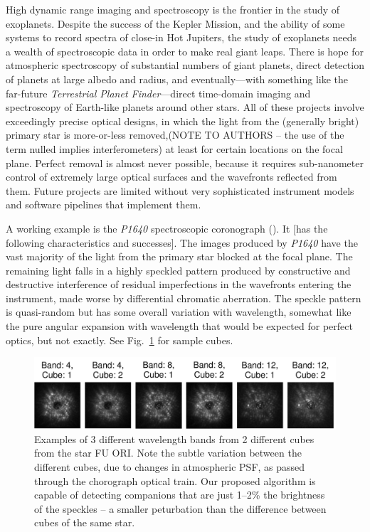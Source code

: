 \documentclass[12pt,pdftex,preprint]{aastex}
\newcommand{\project}[1]{\textsl{#1}}
\newcommand{\fig}[1]{Fig.\ \ref{fig:#1}}
\begin{document}
High dynamic range imaging and spectroscopy is the frontier in
the study of exoplanets. Despite the success of the Kepler Mission,
and the ability of some systems to record spectra of close-in Hot
Jupiters, the study of exoplanets needs a wealth of spectroscopic data
in order to make real giant leaps.  There is hope for atmospheric
spectroscopy
of substantial numbers of giant planets, direct detection of planets
at large albedo and radius, and eventually---with something like the
far-future \project{Terrestrial Planet Finder}---direct time-domain
imaging and spectroscopy of Earth-like planets around other stars.
All of these projects involve exceedingly precise optical designs, in
which the light from the (generally bright) primary star is
more-or-less removed,(NOTE TO AUTHORS – the use of the term nulled
implies interferometers)  at least for certain locations on the focal
plane.  Perfect removal is almost never possible, because it requires
sub-nanometer control of extremely large optical surfaces and the
wavefronts reflected from them.  Future projects are limited
without very sophisticated instrument models and software pipelines
that implement them.

A working example is the \project{P1640} spectroscopic coronograph
(\citealt{p1640}).  It [has the following characteristics and
 successes].  The images produced by \project{P1640} have the vast
majority of the light from the primary star blocked at the focal plane.
The remaining light falls in a highly speckled pattern produced by
constructive and destructive interference of residual imperfections in
the wavefronts entering the instrument, made worse by differential
chromatic aberration.  The speckle pattern is quasi-random but has
some overall variation with wavelength, somewhat like the pure angular
expansion with wavelength that would be expected for perfect optics,
but not exactly. See \fig{examples} for sample cubes.

\begin{figure}[h!]
\begin{center}
\includegraphics[width=6in]{figs/examples.pdf}
\end{center}
\vspace{-7mm}
\caption{Examples of 3 different wavelength bands from 2 different
 cubes from the star FU ORI. Note the subtle variation between the
 different cubes, due to changes in atmospheric PSF, as passed
 through the chorograph optical train. Our proposed algorithm is
 capable of detecting companions that are just 1--2\% the brightness
 of the speckles -- a smaller peturbation than the difference between
 cubes of the same star.}
\label{fig:examples}
\end{figure}
\end{document}
